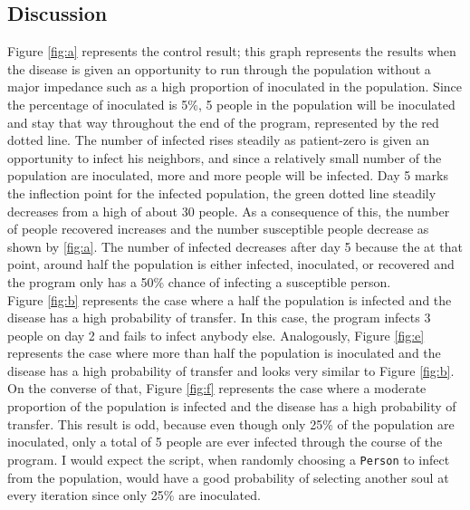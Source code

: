 \documentclass[paper=a4, fontsize=11pt]{scrartcl}
\begin{document}
\subsection{Discussion}

Figure \ref{fig:a} represents the control result; this graph represents the results when the disease is given an opportunity to run through the population without a major impedance such as a high proportion of inoculated in the population. Since the percentage of inoculated is 5\%, 5 people in the population will be inoculated and stay that way throughout the end of the program, represented by the red dotted line. The number of infected rises steadily as patient-zero is given an opportunity to infect his neighbors, and since a relatively small number of the population are inoculated, more and more people will be infected. Day 5 marks the inflection point for the infected population, the green dotted line steadily decreases from a high of about 30 people. As a consequence of this, the number of people recovered increases and the number susceptible people decrease as shown by \ref{fig:a}. The number of infected decreases after day 5 because the at that point, around half the population is either infected, inoculated, or recovered and the program only has a 50\% chance of infecting a susceptible person.\\

Figure \ref{fig:b} represents the case where a half the population is infected and the disease has a high probability of transfer. In this case, the program infects 3 people on day 2 and fails to infect anybody else. Analogously, Figure \ref{fig:e} represents the case where more than half the population is inoculated and the disease has a high probability of transfer and looks very similar to Figure \ref{fig:b}.\\

On the converse of that, Figure \ref{fig:f} represents the case where a moderate proportion of the population is infected and the disease has a high probability of transfer. This result is odd, because even though only 25\% of the population are inoculated, only a total of 5 people are ever infected through the course of the program. I would expect the script, when randomly choosing a \texttt{Person} to infect from the population, would have a good probability of selecting another soul at every iteration since only 25\% are inoculated.\\
\end{document}

